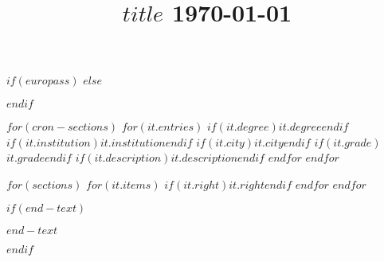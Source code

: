 \documentclass[
$if(europass.nologo)$
  nologo,
$endif$
$if(europass.notitle)$
  notitle,
$endif$
$if(europass.nototpages)$
  nototpages,
$endif$
]{europasscv}
\title{$title$ \today}
\begin{document}
$if(europass)$
\ecvpersonalinfo
$else$
\maketitle
$endif$

$for(cron-sections)$
  $for(it.entries)$
    {$if(it.degree)$$it.degree$$endif$}
    {$if(it.institution)$$it.institution$$endif$}
    {$if(it.city)$$it.city$$endif$}
    {$if(it.grade)$$it.grade$$endif$}
    {$if(it.description)$$it.description$$endif$}
  $endfor$
$endfor$

$for(sections)$
  $for(it.items)$
    {$if(it.right)$$it.right$$endif$}
  $endfor$
$endfor$

$if(end-text)$
\vfill
\begin{center}
\textit{\small $end-text$}
\end{center}
$endif$
\end{document}
